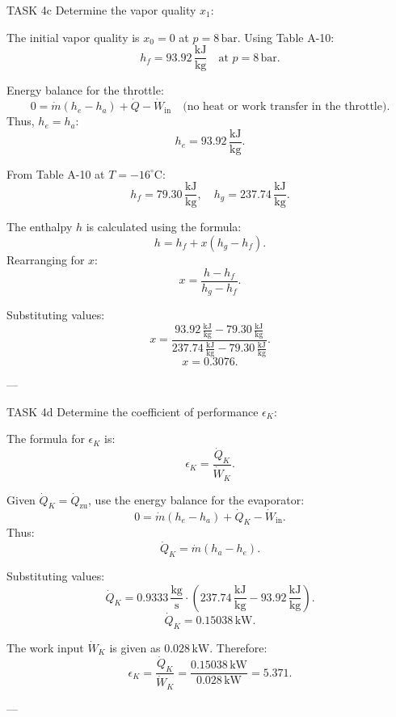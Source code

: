 TASK 4c  
Determine the vapor quality \( x_1 \):  

The initial vapor quality is \( x_0 = 0 \) at \( p = 8 \, \text{bar} \). Using Table A-10:  
\[
h_f = 93.92 \, \frac{\text{kJ}}{\text{kg}} \quad \text{at } p = 8 \, \text{bar}.
\]  

Energy balance for the throttle:  
\[
0 = \dot{m} (h_e - h_a) + \dot{Q} - \dot{W}_{\text{in}} \quad \text{(no heat or work transfer in the throttle)}.
\]  
Thus, \( h_e = h_a \):  
\[
h_e = 93.92 \, \frac{\text{kJ}}{\text{kg}}.
\]  

From Table A-10 at \( T = -16^\circ\text{C} \):  
\[
h_f = 79.30 \, \frac{\text{kJ}}{\text{kg}}, \quad h_g = 237.74 \, \frac{\text{kJ}}{\text{kg}}.
\]  

The enthalpy \( h \) is calculated using the formula:  
\[
h = h_f + x (h_g - h_f).
\]  
Rearranging for \( x \):  
\[
x = \frac{h - h_f}{h_g - h_f}.
\]  

Substituting values:  
\[
x = \frac{93.92 \, \frac{\text{kJ}}{\text{kg}} - 79.30 \, \frac{\text{kJ}}{\text{kg}}}{237.74 \, \frac{\text{kJ}}{\text{kg}} - 79.30 \, \frac{\text{kJ}}{\text{kg}}}.
\]  
\[
x = 0.3076.
\]  

---

TASK 4d  
Determine the coefficient of performance \( \epsilon_K \):  

The formula for \( \epsilon_K \) is:  
\[
\epsilon_K = \frac{\dot{Q}_K}{\dot{W}_K}.
\]  

Given \( \dot{Q}_K = \dot{Q}_\text{zu} \), use the energy balance for the evaporator:  
\[
0 = \dot{m} (h_e - h_a) + \dot{Q}_K - \dot{W}_{\text{in}}.
\]  
Thus:  
\[
\dot{Q}_K = \dot{m} (h_a - h_e).
\]  

Substituting values:  
\[
\dot{Q}_K = 0.9333 \, \frac{\text{kg}}{\text{s}} \cdot (237.74 \, \frac{\text{kJ}}{\text{kg}} - 93.92 \, \frac{\text{kJ}}{\text{kg}}).
\]  
\[
\dot{Q}_K = 0.15038 \, \text{kW}.
\]  

The work input \( \dot{W}_K \) is given as \( 0.028 \, \text{kW} \). Therefore:  
\[
\epsilon_K = \frac{\dot{Q}_K}{\dot{W}_K} = \frac{0.15038 \, \text{kW}}{0.028 \, \text{kW}} = 5.371.
\]  

---